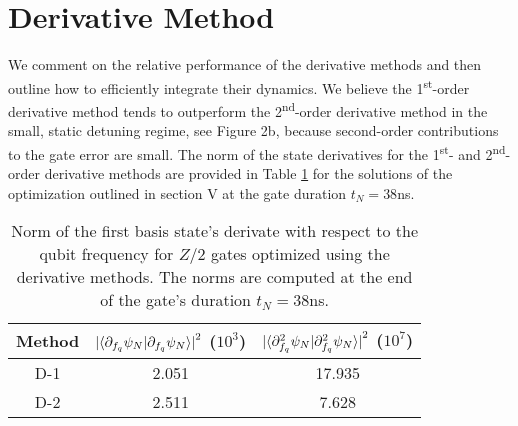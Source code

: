 \section{Derivative Method}
\label{appendix:derivative}
We comment on the relative performance of the derivative methods and then
outline how to efficiently integrate their dynamics.
We believe the 1\textsuperscript{st}-order derivative method tends
to outperform the 2\textsuperscript{nd}-order
derivative method in the small, static detuning regime, see Figure 2b,
because second-order contributions to the gate error are small.
The norm of the state derivatives for the 1\textsuperscript{st}- and 2\textsuperscript{nd}-order
derivative methods are provided in Table \ref{tab:dnorm} for the solutions of the optimization outlined
in section V at the gate duration $t_{N} = 38$ns.

\begin{table}[h]
  \label{tab:dnorm}
  \begin{tabular}{c | c | c}
    Method & ${\lvert \braket{\partial_{f_{q}} \psi_{N} | \partial_{f_{q}} \psi_{N}} \rvert}^{2}$ ($10^{3}$)
    & ${\lvert \braket{\partial^{2}_{f_{q}} \psi_{N} | \partial^{2}_{f_{q}} \psi_{N}} \rvert}^{2}$ ($10^{7}$)\\
    \hline
    D-1 & 2.051 & 17.935\\
    D-2 & 2.511 & 7.628\\
  \end{tabular}
  \caption{Norm of the first basis state's derivate with respect to the qubit frequency
    for $Z/2$ gates optimized using the derivative methods. The norms are computed
    at the end of the gate's duration $t_{N} = 38$ns.}
\end{table}

